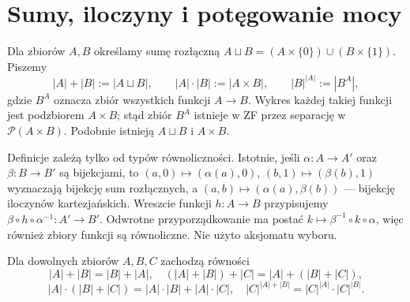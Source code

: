 \section{Sumy, iloczyny i potęgowanie mocy}
\begin{definicja}\label{def:card-operations}
Dla zbiorów $A,B$ określamy sumę rozłączną $A\sqcup B=(A\times\{0\})\cup(B\times\{1\})$. Piszemy
\[
|A|+|B|:=|A\sqcup B|,\qquad |A|\cdot|B|:=|A\times B|,
\qquad |B|^{|A|}:=|B^A|,
\]
gdzie $B^A$ oznacza zbiór wszystkich funkcji $A\to B$.
Wykres każdej takiej funkcji jest podzbiorem $A\times B$;
stąd zbiór $B^A$ istnieje w ZF przez separację
w $\mathcal P(A\times B)$.
Podobnie istnieją $A\sqcup B$ i $A\times B$.

Definicje zależą tylko od typów równoliczności.
Istotnie, jeśli $\alpha:A\to A'$ oraz
$\beta:B\to B'$ są bijekcjami, to
$(a,0)\mapsto(\alpha(a),0)$,
$(b,1)\mapsto(\beta(b),1)$
wyznaczają bijekcję sum rozłącznych,
a $(a,b)\mapsto(\alpha(a),\beta(b))$
--- bijekcję iloczynów kartezjańskich.
Wreszcie funkcji $h:A\to B$ przypisujemy
$\beta\circ h\circ\alpha^{-1}:A'\to B'$.
Odwrotne przyporządkowanie ma postać
$k\mapsto\beta^{-1}\circ k\circ\alpha$,
więc również zbiory funkcji są równoliczne.
Nie użyto aksjomatu wyboru.
\end{definicja}
\begin{twierdzenie}\label{thm:card-laws}
Dla dowolnych zbiorów $A,B,C$ zachodzą równości
\[
|A|+|B|=|B|+|A|,\quad (|A|+|B|)+|C|=|A|+(|B|+|C|),
\]
\[
|A|\cdot(|B|+|C|)=|A|\cdot|B|+|A|\cdot|C|,
\quad |C|^{|A|+|B|}=|C|^{|A|}\cdot|C|^{|B|}.
\]
\end{twierdzenie}
